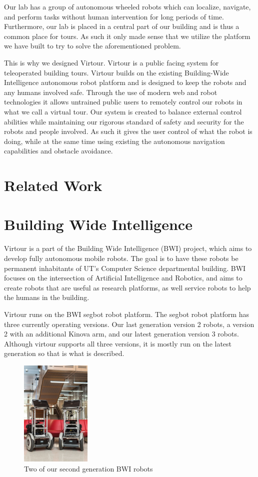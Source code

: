 \documentclass{sig-alternate-05-2015}
\begin{document}
Our lab has a group of autonomous wheeled robots which can localize, navigate,
and perform tasks without human intervention for long periods of time.
Furthermore, our lab is placed in a central part of our building and is thus a
common place for tours. As such it only made sense that we utilize the platform
we have built to try to solve the aforementioned problem.

This is why we designed Virtour. Virtour is a public facing system for
teleoperated building tours. Virtour builds on the existing Building-Wide
Intelligence autonomous robot platform and is designed to keep the robots and
any humans involved safe. Through the use of modern web and robot technologies
it allows untrained public users to remotely control our robots in what we call
a virtual tour. Our system is created to balance external control abilities
while maintaining our rigorous standard of safety and security for the robots
and people involved. As such it gives the user control of what the robot is
doing, while at the same time using existing the autonomous navigation
capabilities and obstacle avoidance.

\section{Related Work}

\section{Building Wide Intelligence}

Virtour is a part of the Building Wide Intelligence (BWI) project,
which aims to develop fully autonomous mobile robots. The goal is to have these
robots be permanent inhabitants of UT's Computer Science departmental
building. BWI focuses on the intersection of Artificial Intelligence and
Robotics, and aims to create robots that are useful as research platforms, as
well service robots to help the humans in the building.

Virtour runs on the BWI segbot robot platform. The segbot robot platform
has three currently operating versions. Our last generation version 2 robots, a
version 2 with an additional Kinova arm, and our latest generation version 3
robots. Although virtour supports all three versions, it is mostly run on the
latest generation so that is what is described.

\begin{figure}
\centering
\includegraphics[height=2in]{bwi}
\caption{Two of our second generation BWI robots}
\end{figure}
\end{document}
